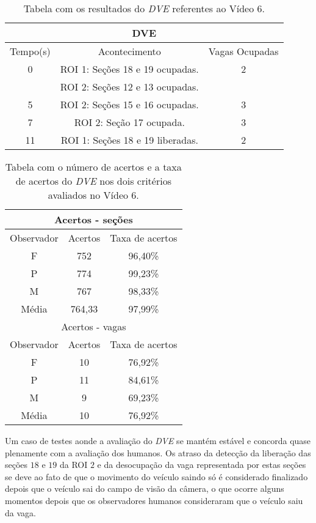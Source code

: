 \begin{table}[H]
\begin{center}
\begin{tabular}{|c||c||c|}
\hline
\multicolumn{3}{|c|}{DVE}  \\ \hline \hline
Tempo(s) & Acontecimento & Vagas Ocupadas \\ \hline
0 & ROI 1: Seções 18 e 19 ocupadas. & 2 \\
 & ROI 2: Seções 12 e 13 ocupadas. &  \\ \hline
5 & ROI 2: Seções 15 e 16 ocupadas. & 3 \\ \hline
7 & ROI 2: Seção 17 ocupada. & 3 \\ \hline
11 & ROI 1: Seções 18 e 19 liberadas. & 2 \\
\hline
\end{tabular}
\end{center}
\caption{Tabela com os resultados do \textit{DVE} referentes ao Vídeo 6.}
\label{tab:video6}
\end{table}

\begin{table}[H]
\begin{center}
\begin{tabular}{|c||c||c|}
\hline
\multicolumn{3}{|c|}{Acertos - seções}  \\ \hline
Observador & Acertos & Taxa de acertos \\ \hline
F & 752 & 96,40\% \\  \hline
P & 774 & 99,23\% \\ \hline
M & 767 & 98,33\% \\ \hline
Média & 764,33 & 97,99\% \\
\hline
\hline
\multicolumn{3}{|c|}{Acertos - vagas}  \\ \hline \hline
Observador & Acertos & Taxa de acertos \\ \hline
F & 10 & 76,92\% \\  \hline
P & 11 & 84,61\% \\ \hline
M & 9 & 69,23\% \\ \hline
Média & 10 & 76,92\% \\
\hline
\end{tabular}
\end{center}
\caption{Tabela com o número de acertos e a taxa de acertos do \textit{DVE} nos dois 
critérios avaliados no Vídeo 6.}
\label{tab:rvideo6}
\end{table}


Um caso de testes aonde a avaliação do \textit{DVE} se mantém estável e concorda quase plenamente com a avaliação dos humanos. Os atraso da detecção da liberação das seções $18$ e $19$ da ROI $2$ e da desocupação da vaga representada por estas seções se deve ao fato de que o movimento do veículo saindo só é considerado finalizado depois que o veículo sai do campo de visão da câmera, o que ocorre alguns momentos depois que os observadores humanos consideraram que o veículo saiu da vaga.

